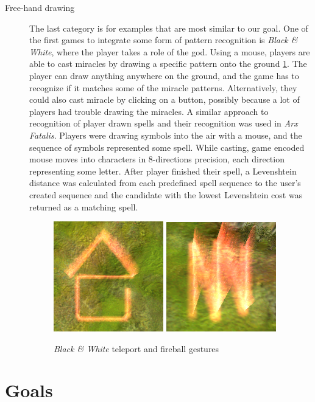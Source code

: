 \begin{description}
\item[Free-hand drawing]
The last category is for examples that are most similar to our goal. One of the first games to integrate some form of pattern recognition is \emph{Black \& White}, where the player takes a role of the god. Using a mouse, players are able to cast miracles by drawing a specific pattern onto the ground \ref{fig:blackwhite}. The player can draw anything anywhere on the ground, and the game has to recognize if it matches some of the miracle patterns. Alternatively, they could also cast miracle by clicking on a button, possibly because a lot of players had trouble drawing the miracles. A similar approach to recognition of player drawn spells and their recognition was used in \emph{Arx Fatalis}. Players were drawing symbols into the air with a mouse, and the sequence of symbols represented some spell. While casting, game encoded mouse moves into characters in 8-directions precision, each direction representing some letter. After player finished their spell, a Levenshtein distance was calculated from each predefined spell sequence to the user's created sequence and the candidate with the lowest Levenshtein cost was returned as a matching spell.

\begin{figure}
\centering
\includegraphics[width=.3\linewidth]{ext/gestureteleport.png}
\quad
\includegraphics[width=.3\linewidth]{ext/gesturefireball.png}
\caption{\emph{Black \& White} teleport and fireball gestures}
\label{fig:blackwhite}
\end{figure}

\end{description}

\section{Goals}

